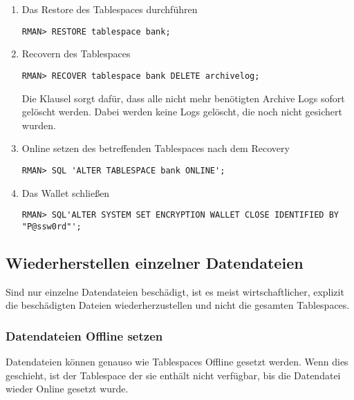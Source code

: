 \begin{enumerate}
            \item Das Restore des Tablespaces durchf\"uhren
              \begin{lstlisting}[caption={Restore des betreffenden Tablespaces},label=admin1466,language=rman]
RMAN> RESTORE tablespace bank;
              \end{lstlisting}
            \item Recovern des Tablespaces
              \begin{lstlisting}[caption={Recovery des Tablespaces},label=admin1467,language=rman]
RMAN> RECOVER tablespace bank DELETE archivelog;
              \end{lstlisting}
              Die Klausel  sorgt daf\"ur, dass alle nicht mehr ben\"otigten Archive Logs sofort gel\"oscht werden. Dabei werden keine Logs gel\"oscht, die noch nicht gesichert wurden.
            \item Online setzen des betreffenden Tablespaces nach dem Recovery
              \begin{lstlisting}[caption={Betreffenden Tablespace Online setzen},label=admin1468,language=rman,emph={[9]ALTER,TABLESPACE,ONLINE},emphstyle={[9]\color{magenta}\bfseries}]
RMAN> SQL 'ALTER TABLESPACE bank ONLINE';
              \end{lstlisting}
            \item Das Wallet schlie\ss{}en
              \begin{lstlisting}[caption={Schlie\ss{}en des Wallets},label=admin1469,language=rman,emph={[9]ALTER,SYSTEM,SET,ENCRYPTION,WALLET,CLOSE,IDENTIFIED,BY},emphstyle={[9]\color{magenta}\bfseries}]
RMAN> SQL'ALTER SYSTEM SET ENCRYPTION WALLET CLOSE IDENTIFIED BY "P@ssw0rd"';
              \end{lstlisting}
          \end{enumerate}
      \subsection{Wiederherstellen einzelner Datendateien}
        Sind nur einzelne Datendateien besch\"adigt, ist es meist wirtschaftlicher, explizit die besch\"adigten Dateien wiederherzustellen und nicht die gesamten Tablespaces.
        \subsubsection{Datendateien Offline setzen}
          Datendateien k\"onnen genauso wie Tablespaces Offline gesetzt werden. Wenn dies geschieht, ist der Tablespace der sie enth\"alt nicht verf\"ugbar, bis die Datendatei wieder Online gesetzt wurde.

